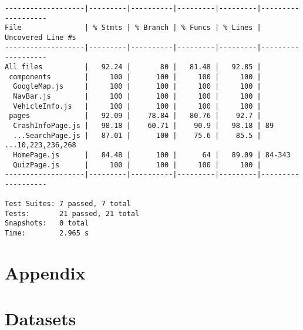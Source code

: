 \documentclass[12pt]{article}
\begin{document}
{\tiny
\begin{verbatim}
-------------------|---------|----------|---------|---------|-------------------
File               | % Stmts | % Branch | % Funcs | % Lines | Uncovered Line #s 
-------------------|---------|----------|---------|---------|-------------------
All files          |   92.24 |       80 |   81.48 |   92.85 |                   
 components        |     100 |      100 |     100 |     100 |                   
  GoogleMap.js     |     100 |      100 |     100 |     100 |                   
  NavBar.js        |     100 |      100 |     100 |     100 |                   
  VehicleInfo.js   |     100 |      100 |     100 |     100 |                   
 pages             |   92.09 |    78.84 |   80.76 |    92.7 |                   
  CrashInfoPage.js |   98.18 |    60.71 |    90.9 |   98.18 | 89                
  ...SearchPage.js |   87.01 |      100 |    75.6 |    85.5 | ...10,223,236,268 
  HomePage.js      |   84.48 |      100 |      64 |   89.09 | 84-343            
  QuizPage.js      |     100 |      100 |     100 |     100 |                   
-------------------|---------|----------|---------|---------|-------------------

Test Suites: 7 passed, 7 total
Tests:       21 passed, 21 total
Snapshots:   0 total
Time:        2.965 s
\end{verbatim}}

\clearpage
\appendix
\section*{Appendix} 
\section{Datasets}
\end{document}
